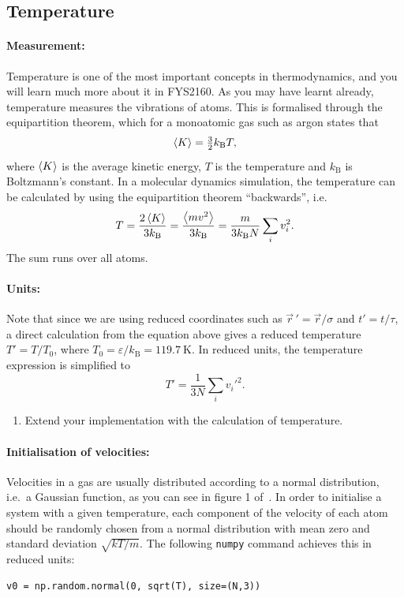\documentclass[11pt,english,a4paper]{report}
\begin{document}
\subsection{Temperature}
\paragraph{Measurement:} Temperature is one of the most important concepts in thermodynamics, and you will learn much more about it in FYS2160. As you may have learnt already, temperature measures the vibrations of atoms. This is formalised through the equipartition theorem, which for a monoatomic gas such as argon states that
\[
    \ev{K} = \tfrac{3}{2}k_\mathrm{B}T,
\]
where \(\ev{K}\) is the average kinetic energy, \(T\) is the temperature and \(k_\mathrm{B}\) is Boltzmann's constant. In a molecular dynamics simulation, the temperature can be calculated by using the equipartition theorem ``backwards'', i.e.
\[
    T = \frac{2\ev{K}}{3k_\mathrm{B}} = \frac{\ev{mv^2}}{3k_\mathrm{B}} = \frac{m}{3k_\mathrm{B}N}\sum_i v_i^2.
\]
The sum runs over all atoms.

\paragraph{Units:} Note that since we are using reduced coordinates such as \(\vec{r}\,'=\vec{r}/\sigma\) and \(t'=t/\tau\), a direct calculation from the equation above gives a reduced temperature \(T'=T/T_0\), where \(T_0 = \varepsilon/k_\mathrm{B}=\SI{119.7}{\kelvin}\). In reduced units, the temperature expression is simplified to
\[
    T' = \frac{1}{3N}\sum_i v_i'^2.
\]
\begin{enumerate}[label=\roman*.]
    \item Extend your implementation with the calculation of temperature.
\end{enumerate}

\paragraph{Initialisation of velocities:} Velocities in a gas are usually distributed according to a normal distribution, i.e.~a Gaussian function, as you can see in figure 1 of~\cite{Rahman_1964}. In order to initialise a system with a given temperature, each component of the velocity of each atom should be randomly chosen from a normal distribution with mean zero and standard deviation \(\sqrt{kT/m}\). The following \texttt{numpy} command achieves this in reduced units:
\begin{lstlisting}
v0 = np.random.normal(0, sqrt(T), size=(N,3))
\end{lstlisting}
\end{document}
